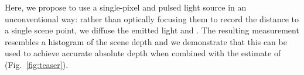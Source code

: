 

Here, we propose to use a single-pixel  and pulsed light source in an
unconventional way: rather than optically focusing them to record the distance
to a single scene point, we diffuse the emitted light and . The resulting  measurement resembles a histogram of the scene depth and we demonstrate that this can be used to achieve accurate absolute
depth when combined with the estimate of  (Fig.~\ref{fig:teaser}).






